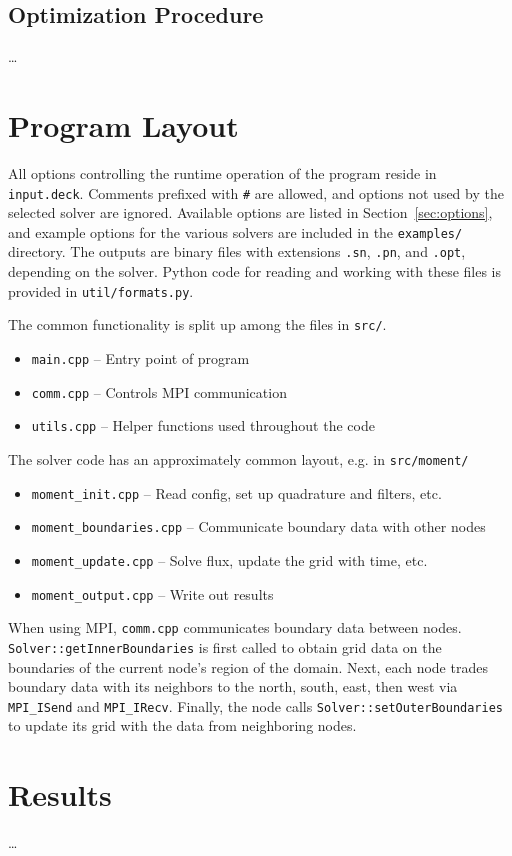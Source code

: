 \documentclass{article}
\newcommand{\comm}{\texttt{comm.cpp}\xspace}
\begin{document}
\subsection{Optimization Procedure}
\dots

\section{Program Layout}
All options controlling the runtime operation of the program reside in
\texttt{input.deck}. Comments prefixed with \texttt{\#} are allowed,
and options not used by the selected solver are ignored. Available options are
listed in Section~\ref{sec:options}, and example options for the various
solvers are included in the \texttt{examples/} directory.
The outputs are binary files with
extensions \texttt{.sn}, \texttt{.pn}, and \texttt{.opt}, depending on
the solver. Python code for reading and working with these files is provided
in \texttt{util/formats.py}.

The common functionality is split up among the files in \texttt{src/}.
\begin{itemize}
 \item \texttt{main.cpp} -- Entry point of program
 \item \texttt{comm.cpp} -- Controls MPI communication
 \item \texttt{utils.cpp} -- Helper functions used throughout the code
 \end{itemize}
The solver code has an approximately common layout, e.g. in \texttt{src/moment/}
\begin{itemize}
 \item \texttt{moment\_init.cpp} -- Read config, set up quadrature and filters, etc.
 \item \texttt{moment\_boundaries.cpp} -- Communicate boundary data with other nodes
 \item \texttt{moment\_update.cpp} -- Solve flux, update the grid with time, etc.
 \item \texttt{moment\_output.cpp} -- Write out results
\end{itemize}

When using MPI, \comm communicates boundary data between nodes.
\texttt{Solver::getInnerBoundaries} is first called to obtain grid data on the
boundaries of the current node's region of the domain. Next, each node trades boundary
data with its neighbors to the north, south, east, then west via
\texttt{MPI\_ISend} and \texttt{MPI\_IRecv}. Finally, the node calls \texttt{Solver::setOuterBoundaries}
to update its grid with the data from neighboring nodes.

\section{Results}
\dots



{\footnotesize
}
\end{document}
